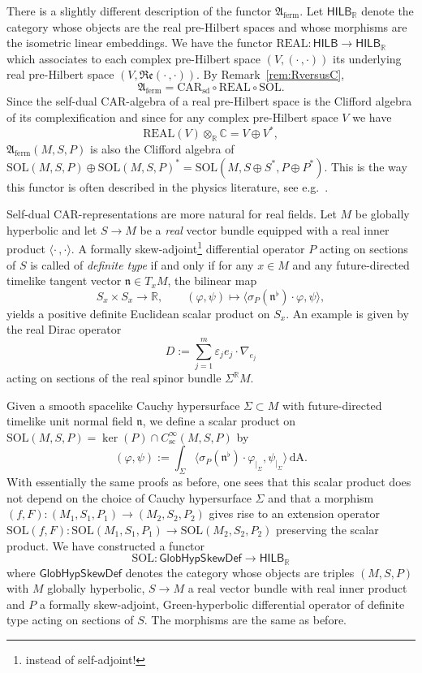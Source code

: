\documentclass[a4paper,11pt]{amsart}
\theoremstyle{definition}
\begin{document}
There is a slightly different description of the functor ${\mathfrak{A}_\mathrm{ferm}}$.
Let ${\mathsf{HILB}_{\mathbb{R}}}$ denote the category whose objects are the real pre-Hilbert spaces and whose morphisms are the isometric linear embeddings.
We have the functor ${\mathrm{REAL}}:{\mathsf{HILB}}\to{\mathsf{HILB}_{\mathbb{R}}}$ which associates to each complex pre-Hilbert space $(V,(\cdot\,,\cdot))$ its underlying real pre-Hilbert space $(V,{\mathfrak{Re}}(\cdot\,,\cdot))$.
By Remark~\ref{rem:RversusC},
$$
{\mathfrak{A}_\mathrm{ferm}}=\mathrm{CAR}_\mathrm{sd}\circ{\mathrm{REAL}}\circ{\mathrm{SOL}} .
$$
Since the self-dual CAR-algebra of a real pre-Hilbert space is the Clifford algebra of its complexification and since for any complex pre-Hilbert space $V$ we have $$
{\mathrm{REAL}}(V) \otimes_{\mathbb{R}} {\mathbb{C}} = V \oplus V^*, 
$$
${\mathfrak{A}_\mathrm{ferm}}(M,S,P)$ is also the Clifford algebra of ${\mathrm{SOL}}(M,S,P) \oplus {\mathrm{SOL}}(M,S,P)^* = {\mathrm{SOL}}(M,S\oplus S^*,P\oplus P^*)$.
This is the way this functor is often described in the physics literature, see e.g.\ \cite[p.~115f]{St}.

Self-dual CAR-representations are more natural for real fields.
Let $M$ be globally hyperbolic and let $S\to M$ be a {\em real} vector bundle equipped with a real inner product ${\langle}\cdot\,,\cdot{\rangle}$.
A formally skew-adjoint\footnote{instead of self-adjoint!} differential operator $P$ acting on sections of $S$ is called of {\em definite type} if and only if for any $x\in M$ and any future-directed timelike tangent vector $\mathfrak{n}\in T_xM$, the bilinear map 
$$
S_x\times S_x \to {\mathbb{R}},
\quad\quad
({\varphi},\psi)\mapsto{\langle} \sigma_P(\mathfrak{n}^\flat)\cdot{\varphi},\psi{\rangle} ,
$$
yields a positive definite Euclidean scalar product on $S_x$.
An example is given by the real Dirac operator 
$$
D:=\sum_{j=1}^m{\varepsilon}_j e_j\cdot{\nabla}_{e_j}
$$
acting on sections of the real spinor bundle $\Sigma^{\mathbb{R}} M$.

Given a smooth spacelike Cauchy hypersurface $\Sigma\subset M$ with future-directed timelike unit normal field $\mathfrak{n}$, we define a scalar product on ${\mathrm{SOL}}(M,S,P)=\ker(P)\cap {C^\infty_\mathrm{sc}}(M,S,P)$ by 
$$
({\varphi},\psi):=\int_\Sigma {\langle} \sigma_P(\mathfrak{n}^\flat)\cdot{\varphi}_{|_\Sigma},\psi_{|_\Sigma}{\rangle}{\,\mathrm{dA}} .
$$
With essentially the same proofs as before, one sees that this scalar product does not depend on the choice of Cauchy hypersurface $\Sigma$ and that a morphism $(f,F):(M_1,S_1,P_1) \to (M_2,S_2,P_2)$ gives rise to an extension operator ${\mathrm{SOL}}(f,F):{\mathrm{SOL}}(M_1,S_1,P_1) \to {\mathrm{SOL}}(M_2,S_2,P_2)$ preserving the scalar product.
We have constructed a functor 
$$
{\mathrm{SOL}}:{\mathsf{GlobHypSkewDef}}\longrightarrow{\mathsf{HILB}_{\mathbb{R}}}
$$
where ${\mathsf{GlobHypSkewDef}}$ denotes the category whose objects are triples $(M,S,P)$ with $M$ globally hyperbolic, $S\to M$ a real vector bundle with real inner product and $P$ a formally skew-adjoint, Green-hyperbolic differential operator of definite type acting on sections of $S$.
The morphisms are the same as before.
\end{document}
